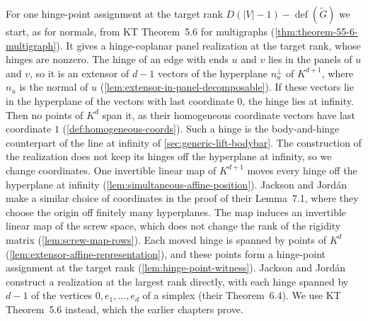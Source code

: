 For one hinge-point assignment at the target rank
$D(|V| - 1) - \operatorname{def}(\tilde G)$ we start, as for normals,
from KT Theorem~5.6 for multigraphs
(\cref{thm:theorem-55-6-multigraph}). It gives a hinge-coplanar panel
realization at the target rank, whose hinges are nonzero. The hinge of
an edge with ends $u$ and $v$ lies in the panels of $u$ and $v$, so it
is an extensor of $d - 1$ vectors of the hyperplane $n_u^\perp$ of
$K^{d+1}$, where $n_u$ is the normal of $u$
(\cref{lem:extensor-in-panel-decomposable}). If these vectors lie in
the hyperplane of the vectors with last coordinate $0$, the hinge lies
at infinity. Then no points of $K^d$ span it, as their homogeneous
coordinate vectors have last coordinate $1$
(\cref{def:homogeneous-coords}). Such a hinge is the body-and-hinge
counterpart of the line at infinity of \cref{sec:generic-lift-bodybar}.
The construction of the realization does not keep its hinges off the
hyperplane at infinity, so we change coordinates. One invertible
linear map of $K^{d+1}$ moves every hinge off the hyperplane at
infinity (\cref{lem:simultaneous-affine-position}). Jackson and
Jord\'an make a similar choice of coordinates in the proof of their
Lemma~7.1, where they choose the origin off finitely many hyperplanes.
The map induces an invertible linear map of the screw space, which does
not change the rank of the rigidity matrix (\cref{lem:screw-map-rows}).
Each moved hinge is spanned by points of $K^d$
(\cref{lem:extensor-affine-representation}), and these points form a
hinge-point assignment at the target rank
(\cref{lem:hinge-point-witness}). Jackson and Jord\'an construct a
realization at the largest rank directly, with each hinge spanned by
$d - 1$ of the vertices $0, e_1, \dots, e_d$ of a simplex (their
Theorem~6.4). We use KT Theorem~5.6 instead, which the earlier chapters
prove.

